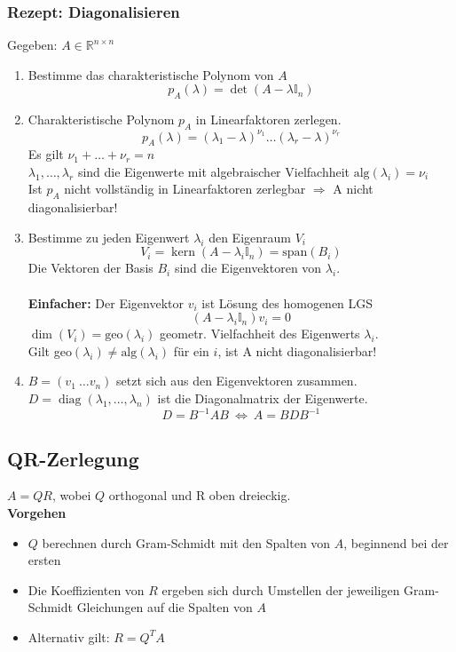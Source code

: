 \documentclass[6pt,a4paper]{scrartcl}
\DeclareMathOperator{\diag}{diag}
\DeclareMathOperator{\Kern}{kern}
\begin{document}
\begin{multicols*}{4}
\subsubsection{Rezept: Diagonalisieren}
Gegeben: $A\in \mathbb{R}^{n\times n}$
\begin{enumerate}\itemsep0pt
\item Bestimme das charakteristische Polynom von $A$
\begin{equation*}
p_A(\lambda)=\det(A-\lambda \mathbb{I}_n)
\end{equation*}
\item Charakteristische Polynom $p_A$ in Linearfaktoren zerlegen.
\begin{equation*}
p_A(\lambda)=(\lambda_1-\lambda)^{\nu_1}\dots(\lambda_r-\lambda)^{\nu_r}
\end{equation*}
Es gilt $\nu_1 + \dots + \nu_r=n$ \\
$\lambda_1,\dots, \lambda_r$ sind die Eigenwerte mit algebraischer Vielfachheit $\text{alg}(\lambda_i)=\nu_i$\\
Ist $p_A$ nicht vollständig in Linearfaktoren zerlegbar $\Rightarrow$ A nicht diagonalisierbar!
\item Bestimme zu jeden Eigenwert $\lambda_i$ den Eigenraum $V_i$
\begin{equation*}
V_i=\Kern(A-\lambda_i\mathbb{I}_n)=\text{span}(B_i)
\end{equation*}
Die Vektoren der Basis $B_i$ sind die Eigenvektoren von $\lambda_i$.\\ \\
\textbf{Einfacher:} Der Eigenvektor $v_i$ ist Lösung des homogenen LGS
\begin{equation*}
(A-\lambda_i \mathbb{I}_n)v_i=0
\end{equation*}
$\dim(V_i)=\text{geo}(\lambda_i)$  geometr. Vielfachheit des Eigenwerts $\lambda_i$. \\
Gilt geo$(\lambda_i)\ne\text{alg}(\lambda_i)$ für ein $i$, ist A nicht diagonalisierbar!
\item $B=(v_1 \ \dots v_n)$ setzt sich aus den Eigenvektoren zusammen. \\
$D=\diag(\lambda_1,\dots,\lambda_n)$ ist die Diagonalmatrix der Eigenwerte.
\begin{equation*}
D=B^{-1}AB \ \Leftrightarrow \ A=BDB^{-1}
\end{equation*}
\end{enumerate}
\subsection{QR-Zerlegung}
$A = QR$, wobei $Q$ orthogonal und R oben dreieckig.\\
\textbf{Vorgehen}
\begin{itemize}\itemsep0pt
 \item $Q$ berechnen durch Gram-Schmidt mit den Spalten von $A$, beginnend bei der ersten
 \item Die Koeffizienten von $R$ ergeben sich durch Umstellen der jeweiligen Gram-Schmidt Gleichungen auf die Spalten von $A$
 \item Alternativ gilt: $R = Q^TA$
\end{itemize}


\end{multicols*}
\end{document}
